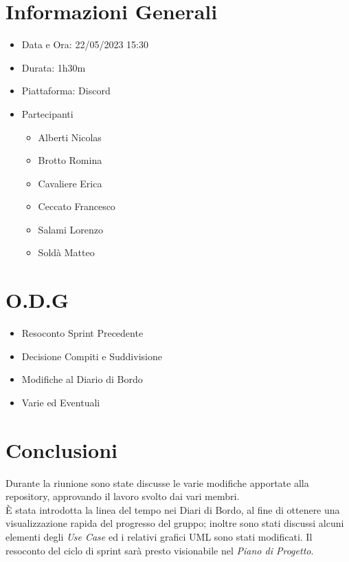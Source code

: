 \documentclass[a4paper, 12pt]{article}
\begin{document}
\makefrontpage

\section*{Informazioni Generali}
\begin{itemize}
    \item Data e Ora: 22/05/2023 15:30
    \item Durata: 1h30m
    \item Piattaforma: Discord
    \item Partecipanti
    \begin{itemize}
        \item Alberti Nicolas
        \item Brotto Romina
        \item Cavaliere Erica
        \item Ceccato Francesco
        \item Salami Lorenzo
        \item Soldà Matteo
    \end{itemize}
\end{itemize}

\section*{O.D.G}
\begin{itemize}
    \item Resoconto Sprint Precedente
    \item Decisione Compiti e Suddivisione
    \item Modifiche al Diario di Bordo
    \item Varie ed Eventuali
\end{itemize}

\section*{Conclusioni}
Durante la riunione sono state discusse le varie modifiche apportate alla
repository, approvando il lavoro svolto dai vari membri. \\
È stata introdotta la linea del tempo nei Diari di Bordo, al fine di ottenere
una visualizzazione rapida del progresso del gruppo; inoltre sono stati
discussi alcuni elementi degli \textit{Use Case} ed i relativi grafici UML sono
stati modificati.
Il resoconto del ciclo di sprint sarà presto visionabile nel \textit{Piano di Progetto}.\\
\end{document}

